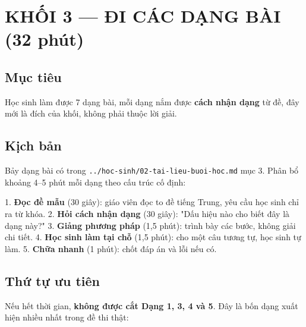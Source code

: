 \documentclass[11pt, a4paper]{article}
\begin{document}
\section{KHỐI 3 — ĐI CÁC DẠNG BÀI (32 phút)}

\subsection{Mục tiêu}

Học sinh làm được 7 dạng bài, mỗi dạng nắm được \textbf{cách nhận dạng} từ đề, đây mới là đích của khối, không phải thuộc lời giải.

\subsection{Kịch bản}

Bảy dạng bài có trong \texttt{../hoc-sinh/02-tai-lieu-buoi-hoc.md} mục 3. Phân bổ khoảng 4–5 phút mỗi dạng theo cấu trúc cố định:

1. \textbf{Đọc đề mẫu} (30 giây): giáo viên đọc to đề tiếng Trung, yêu cầu học sinh chỉ ra từ khóa.
2. \textbf{Hỏi cách nhận dạng} (30 giây): "Dấu hiệu nào cho biết đây là dạng này?"
3. \textbf{Giảng phương pháp} (1,5 phút): trình bày các bước, không giải chi tiết.
4. \textbf{Học sinh làm tại chỗ} (1,5 phút): cho một câu tương tự, học sinh tự làm.
5. \textbf{Chữa nhanh} (1 phút): chốt đáp án và lỗi nếu có.

\subsection{Thứ tự ưu tiên}

Nếu hết thời gian, \textbf{không được cắt Dạng 1, 3, 4 và 5}. Đây là bốn dạng xuất hiện nhiều nhất trong đề thi thật:

\end{document}
